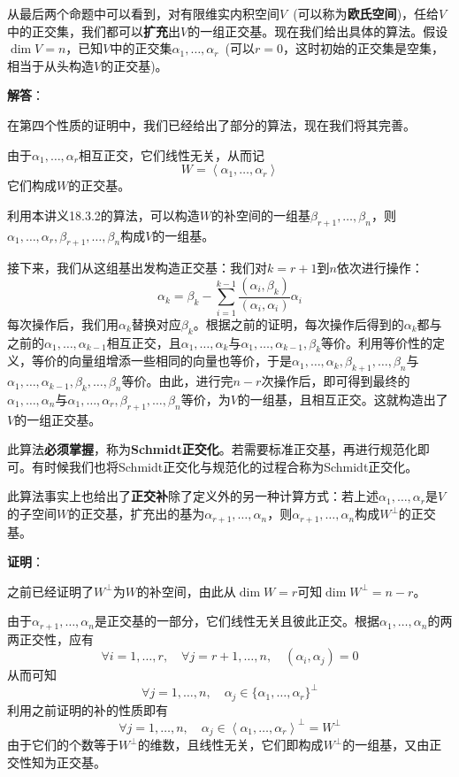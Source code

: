 \documentclass[a4paper,UTF8,fontset=windows,AutoFakeBold]{ctexart}
\newcommand*{\note}{\noindent *}
\newcommand{\proo}[1]{{\vspace{5pt}\kaishu\noindent\textbf{证明}：\vspace{-3pt}
\begin{compactitem}
    \item[] #1
\end{compactitem}
}}
\newcommand{\sol}[1]{{\vspace{5pt}\kaishu\noindent\textbf{解答}：\vspace{-3pt}
\begin{compactitem}
    \item[] #1
\end{compactitem}
}}
\begin{document}
从最后两个命题中可以看到，对有限维实内积空间$V$\ (可以称为\textbf{欧氏空间})，任给$V$中的正交集，我们都可以\textbf{扩充}出$V$的一组正交基。现在我们给出具体的算法。假设$\dim V=n$，已知$V$中的正交集$\alpha_1,\dots,\alpha_r$\ (可以$r=0$，这时初始的正交集是空集，相当于从头构造$V$的正交基)。

\sol{
    在第四个性质的证明中，我们已经给出了部分的算法，现在我们将其完善。

    由于$\alpha_1,\dots,\alpha_r$相互正交，它们线性无关，从而记
    $$W=\left<\alpha_1,\dots,\alpha_r\right>$$
    它们构成$W$的正交基。

    利用本讲义18.3.2的算法，可以构造$W$的补空间的一组基$\beta_{r+1},\dots,\beta_n$，则$\alpha_1,\dots,\alpha_r,\beta_{r+1},\dots,\beta_n$构成$V$的一组基。

    接下来，我们从这组基出发构造正交基：我们对$k=r+1$到$n$依次进行操作：
    $$\alpha_k=\beta_k-\sum_{i=1}^{k-1}\frac{(\alpha_i,\beta_k)}{(\alpha_i,\alpha_i)}\alpha_i$$
    每次操作后，我们用$\alpha_k$替换对应$\beta_k$。根据之前的证明，每次操作后得到的$\alpha_k$都与之前的$\alpha_1,\dots,\alpha_{k-1}$相互正交，且$\alpha_1,\dots,\alpha_k$与$\alpha_1,\dots,\alpha_{k-1},\beta_k$等价。利用等价性的定义，等价的向量组增添一些相同的向量也等价，于是$\alpha_1,\dots,\alpha_k,\beta_{k+1},\dots,\beta_n$与$\alpha_1,\dots,\alpha_{k-1},\beta_k,\dots,\beta_n$等价。由此，进行完$n-r$次操作后，即可得到最终的$\alpha_1,\dots,\alpha_n$与$\alpha_1,\dots,\alpha_r,\beta_{r+1},\dots,\beta_n$等价，为$V$的一组基，且相互正交。这就构造出了$V$的一组正交基。
}

\note 此算法\textbf{必须掌握}，称为\textbf{Schmidt正交化}。若需要标准正交基，再进行规范化即可。有时候我们也将Schmidt正交化与规范化的过程合称为Schmidt正交化。

此算法事实上也给出了\textbf{正交补}除了定义外的另一种计算方式：若上述$\alpha_1,\dots,\alpha_r$是$V$的子空间$W$的正交基，扩充出的基为$\alpha_{r+1},\dots,\alpha_n$，则$\alpha_{r+1},\dots,\alpha_n$构成$W^\bot$的正交基。

\proo{
    之前已经证明了$W^\bot$为$W$的补空间，由此从$\dim W=r$可知$\dim W^\bot=n-r$。

    由于$\alpha_{r+1},\dots,\alpha_n$是正交基的一部分，它们线性无关且彼此正交。根据$\alpha_1,\dots,\alpha_n$的两两正交性，应有
    $$\forall i=1,\dots,r,\quad\forall j=r+1,\dots,n,\quad(\alpha_i,\alpha_j)=0$$
    从而可知
    $$\forall j=1,\dots,n,\quad\alpha_j\in\{\alpha_1,\dots,\alpha_r\}^\bot$$
    利用之前证明的补的性质即有
    $$\forall j=1,\dots,n,\quad\alpha_j\in\left<\alpha_1,\dots,\alpha_r\right>^\bot=W^\bot$$
    由于它们的个数等于$W^\bot$的维数，且线性无关，它们即构成$W^\bot$的一组基，又由正交性知为正交基。
}
\end{document}
